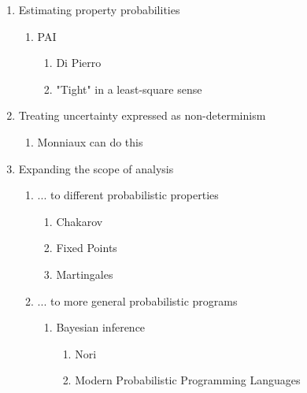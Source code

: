 {\begin{enumerate}
 \item Estimating property probabilities
   \begin{enumerate}
    \item PAI
     \begin{enumerate}
      \item Di Pierro
      \item "Tight" in a least-square sense
     \end{enumerate}
   \end{enumerate}

 \item Treating uncertainty expressed as non-determinism
   \begin{enumerate}
    \item Monniaux can do this 
   \end{enumerate}

 \item Expanding the scope of analysis
   \begin{enumerate}
    \item ... to different probabilistic properties
      \begin{enumerate}
        \item Chakarov
        \item Fixed Points
        \item Martingales
      \end{enumerate}
    \item ... to more general probabilistic programs
      \begin{enumerate}
        \item Bayesian inference
          \begin{enumerate}
            \item Nori
            \item Modern Probabilistic Programming Languages
          \end{enumerate}
      \end{enumerate}
   \end{enumerate}

\end{enumerate}
}
